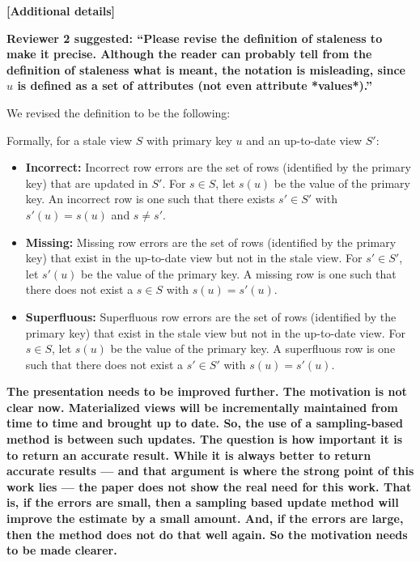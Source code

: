 \vspace{2.0em}

\textbf{[Additional details]}

\textbf{Reviewer 2 suggested: “Please revise the definition of staleness to make it precise. Although the reader can probably tell from the definition of staleness what is meant, the notation is misleading, since $u$ is defined as a set of attributes (not even attribute *values*).”}

We revised the definition to be the following:

Formally, for a stale view $S$ with primary key $u$ and an up-to-date view $S'$:
\begin{itemize}[noitemsep] \sloppy
	\item \textbf{Incorrect: } Incorrect row errors are the set of rows (identified by the primary key) that are updated in $S'$. For $s \in S$, let $s(u)$ be the value of the primary key. An incorrect row is one such that there exists $s' \in S'$ with $s'(u) = s(u)$ and $s \ne s'$.
	\item \textbf{Missing: } Missing row errors are the set of rows (identified by the primary key) that exist in the up-to-date view but not in the stale view. For $s' \in S'$, let $s'(u)$ be the value of the primary key. A missing row is one such that there does not exist a $s \in S$ with $s(u) = s'(u)$.
	\item \textbf{Superfluous: } Superfluous row errors are the set of rows (identified by the primary key) that exist in the stale view but not in the up-to-date view. For $s \in S$, let $s(u)$ be the value of the primary key. A superfluous row is one such that there does not exist a $s' \in S'$ with $s(u) = s'(u)$.
\end{itemize}

\vspace{1.5em}

\textbf{The presentation needs to be improved further. The motivation is not clear now. Materialized views will be incrementally maintained from time to time and brought up to date. So, the use of a sampling-based method is between such updates. The question is how important it is to return an accurate result. While it is always better to return accurate results --- and that argument is where the strong point of this work lies --- the paper does not show the real need for this work. That is, if the errors are small, then a sampling based update method will improve the estimate by a small amount. And, if the errors are large, then the method does not do that well again. So the motivation needs to be made clearer.}

